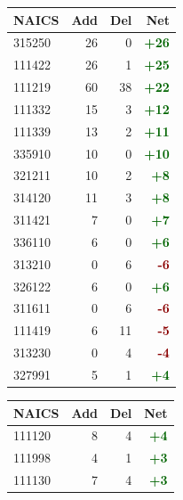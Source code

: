 \documentclass[11pt]{article}
\begin{document}
\begin{table}[H]
\centering
\begin{minipage}{0.48\textwidth}
\centering
{}
\begin{tabular}{lrrr}
\toprule
\textbf{NAICS} & \textbf{Add} & \textbf{Del} & \textbf{Net} \\
\midrule
315250 & 26 & 0 & \textcolor{darkgreen}{\textbf{+26}} \\
111422 & 26 & 1 & \textcolor{darkgreen}{\textbf{+25}} \\
111219 & 60 & 38 & \textcolor{darkgreen}{\textbf{+22}} \\
111332 & 15 & 3 & \textcolor{darkgreen}{\textbf{+12}} \\
111339 & 13 & 2 & \textcolor{darkgreen}{\textbf{+11}} \\
335910 & 10 & 0 & \textcolor{darkgreen}{\textbf{+10}} \\
321211 & 10 & 2 & \textcolor{darkgreen}{\textbf{+8}} \\
314120 & 11 & 3 & \textcolor{darkgreen}{\textbf{+8}} \\
311421 & 7 & 0 & \textcolor{darkgreen}{\textbf{+7}} \\
336110 & 6 & 0 & \textcolor{darkgreen}{\textbf{+6}} \\
313210 & 0 & 6 & \textcolor{darkred}{\textbf{-6}} \\
326122 & 6 & 0 & \textcolor{darkgreen}{\textbf{+6}} \\
311611 & 0 & 6 & \textcolor{darkred}{\textbf{-6}} \\
111419 & 6 & 11 & \textcolor{darkred}{\textbf{-5}} \\
313230 & 0 & 4 & \textcolor{darkred}{\textbf{-4}} \\
327991 & 5 & 1 & \textcolor{darkgreen}{\textbf{+4}} \\
\bottomrule
\end{tabular}
\end{minipage}
\hfill
\begin{minipage}{0.48\textwidth}
\centering
{}
\begin{tabular}{lrrr}
\toprule
\textbf{NAICS} & \textbf{Add} & \textbf{Del} & \textbf{Net} \\
\midrule
111120 & 8 & 4 & \textcolor{darkgreen}{\textbf{+4}} \\
111998 & 4 & 1 & \textcolor{darkgreen}{\textbf{+3}} \\
111130 & 7 & 4 & \textcolor{darkgreen}{\textbf{+3}} \\

\end{tabular}
\end{minipage}
\end{table}
\end{document}
